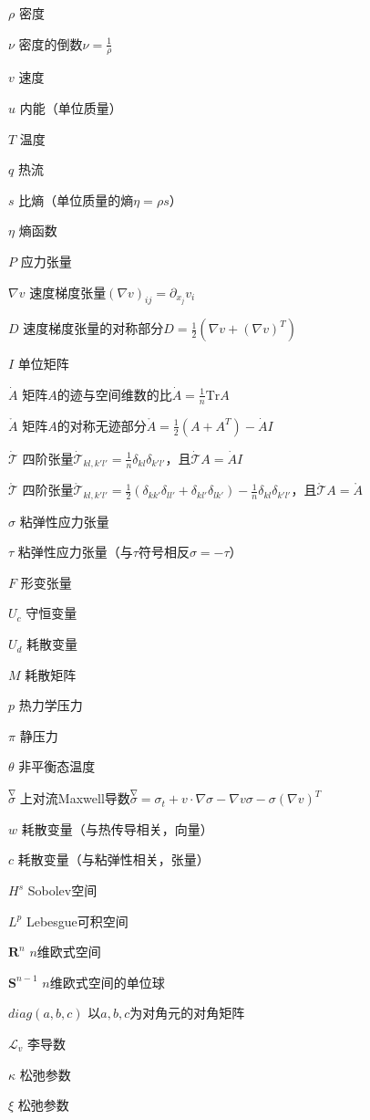 \begin{denotation}[3cm]

\item[$\rho$] 密度
\item[$\nu$] 密度的倒数$\nu=\frac{1}{\rho}$
\item[$v$] 速度
\item[$u$] 内能（单位质量）
\item[$T$] 温度
\item[$q$] 热流
\item[$s$] 比熵（单位质量的熵$\eta = \rho s$）
\item[$\eta$] 熵函数
\item[$P$] 应力张量
\item[$\nabla v$] 速度梯度张量$(\nabla v)_{ij} = \partial_{x_j} v_i$
\item[$D$] 速度梯度张量的对称部分$D = \frac{1}{2}(\nabla v + (\nabla v)^T)$
\item[$I$] 单位矩阵
\item[$\dot{A}$] 矩阵$A$的迹与空间维数的比$\dot{A} = \frac{1}{n} \mbox{Tr} A$
\item[$\mathring{A}$] 矩阵$A$的对称无迹部分$\mathring{A} = \frac{1}{2}(A+A^T) - \dot{A}I$
\item[$\dot{\mathcal{T}}$] 四阶张量$\dot{\mathcal{T}}_{kl,k'l'} = \frac{1}{n}\delta_{kl} \delta_{k'l'}$，且$\dot{\mathcal{T}} A = \dot{A} I$
\item[$\mathring{\mathcal{T}}$] 四阶张量$\mathring{\mathcal{T}}_{kl,k'l'} =\frac{1}{2}(\delta_{kk'}\delta_{ll'} + \delta_{kl'} \delta_{lk'} ) -\frac{1}{n}\delta_{kl} \delta_{k'l'} $，且$\mathring{\mathcal{T}} A = \mathring{A}$
\item[$\sigma$] 粘弹性应力张量
\item[$\tau$] 粘弹性应力张量（与$\tau$符号相反$\sigma=-\tau$）
\item[$F$] 形变张量
\item[$U_c$] 守恒变量
\item[$U_d$] 耗散变量
\item[$M$] 耗散矩阵
\item[$p$] 热力学压力
\item[$\pi$] 静压力
\item[$\theta$] 非平衡态温度
\item[$\stackrel{\nabla} \sigma$] 上对流Maxwell导数$\stackrel{\nabla} \sigma = \sigma_t + v \cdot \nabla \sigma - \nabla v \sigma - \sigma (\nabla v)^T$
\item[$w$] 耗散变量（与热传导相关，向量）
\item[$c$] 耗散变量（与粘弹性相关，张量）
\item[$H^s$] Sobolev空间
\item[$L^p$] Lebesgue可积空间
\item[$\mathbf{R}^n$] $n$维欧式空间
\item[$\mathbf{S}^{n-1}$] $n$维欧式空间的单位球
\item[$diag(a,b,c)$] 以$a,b,c$为对角元的对角矩阵
\item[$\mathcal{L}_v$] 李导数 
\item[$\kappa$] 松弛参数
\item[$\xi$] 松弛参数

\end{denotation}
